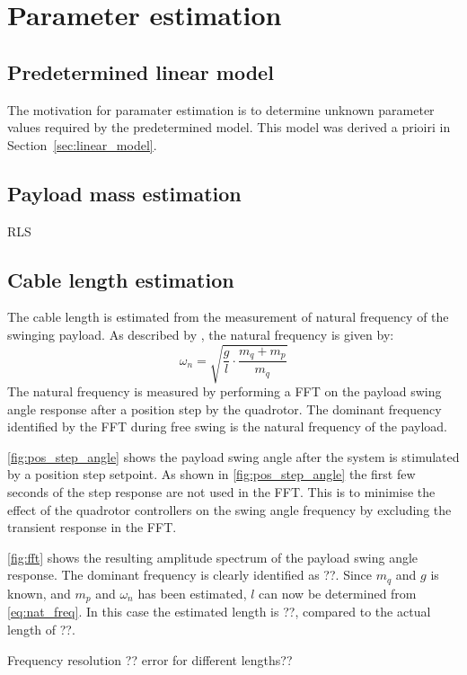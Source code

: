 \section{Parameter estimation}
\subsection{Predetermined linear model}
    The motivation for paramater estimation is to determine unknown parameter values required by the predetermined model.
    This model was derived a prioiri in Section~\ref{sec:linear_model}.
    
\subsection{Payload mass estimation}
    RLS

\subsection{Cable length estimation}
    The cable length is estimated from the measurement of natural frequency of the swinging payload.
    As described by
    \cite{bisgaard},
    the natural frequency is given by:
    \begin{equation} \label{eq:nat_freq}
        \omega_n = \sqrt{ \frac{g}{l} \cdot \frac{m_q + m_p}{m_q}}
    \end{equation}
    The natural frequency is measured by performing a FFT on the payload swing angle response after a position step by the quadrotor.
    The dominant frequency identified by the FFT during free swing is the natural frequency of the payload.
    
    \ref{fig:pos_step_angle}
    shows the payload swing angle after the system is stimulated by a position step setpoint.
    As shown in 
    \ref{fig:pos_step_angle}
    the first few seconds of the step response are not used in the FFT.
    This is to minimise the effect of the quadrotor controllers on the swing angle frequency 
    by excluding the transient response in the FFT.

    \ref{fig:fft} 
    shows the resulting amplitude spectrum of the payload swing angle response.
    The dominant frequency is clearly identified as ??.
    Since $m_q$ and $g$ is known, and $m_p$ and $\omega_n$ has been estimated, $l$ can now be determined from
    \ref{eq:nat_freq}.
    In this case the estimated length is ??, compared to the actual length of ??.
    
    Frequency resolution ??
    error for different lengths??

